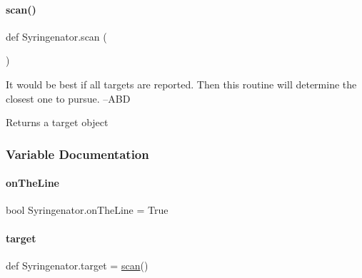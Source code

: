 \paragraph{\texorpdfstring{scan()}{scan()}}
{\footnotesize\ttfamily def Syringenator.\+scan (\begin{DoxyParamCaption}{ }\end{DoxyParamCaption})}

It would be best if all targets are reported. Then this routine will determine the closest one to pursue. --A\+BD

\begin{DoxyReturn}{Returns}
a target object 
\end{DoxyReturn}


\subsubsection{Variable Documentation}
\mbox{\label{namespaceSyringenator_a161fa877b77c9ebb120c1ed20739260b}} 
\paragraph{\texorpdfstring{onTheLine}{onTheLine}}
{\footnotesize\ttfamily bool Syringenator.\+on\+The\+Line = True}

\mbox{\label{namespaceSyringenator_a66c7999289f77a4adce05169661f9660}} 
\paragraph{\texorpdfstring{target}{target}}
{\footnotesize\ttfamily def Syringenator.\+target = \mbox{\hyperlink{namespaceSyringenator_aff01237d3ff3e33f0ffc32927d813df0}{scan}}()}

